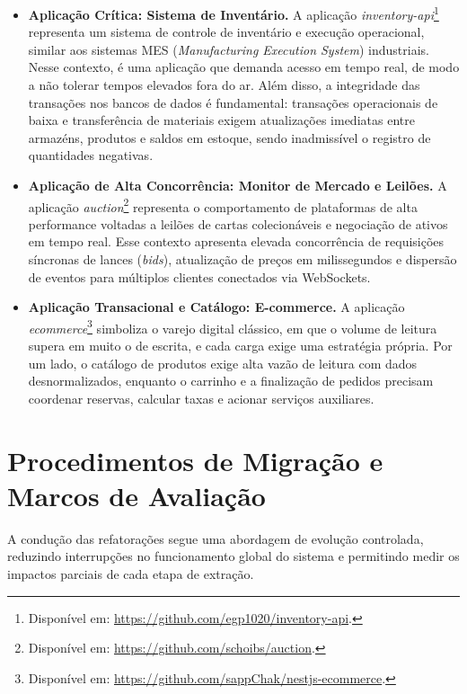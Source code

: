 \begin{itemize}
    \item \textbf{Aplicação Crítica: Sistema de Inventário.} A aplicação \textit{inventory-api}\footnote{Disponível em: \url{https://github.com/egp1020/inventory-api}.} representa um sistema de controle de inventário e execução operacional, similar aos sistemas MES (\textit{Manufacturing Execution System}) industriais. Nesse contexto, é uma aplicação que demanda acesso em tempo real, de modo a não tolerar tempos elevados fora do ar. Além disso, a integridade das transações nos bancos de dados é fundamental: transações operacionais de baixa e transferência de materiais exigem atualizações imediatas entre armazéns, produtos e saldos em estoque, sendo inadmissível o registro de quantidades negativas.
    
    \item \textbf{Aplicação de Alta Concorrência: Monitor de Mercado e Leilões.} A aplicação \textit{auction}\footnote{Disponível em: \url{https://github.com/schoibs/auction}.} representa o comportamento de plataformas de alta performance voltadas a leilões de cartas colecionáveis e negociação de ativos em tempo real. Esse contexto apresenta elevada concorrência de requisições síncronas de lances (\textit{bids}), atualização de preços em milissegundos e dispersão de eventos para múltiplos clientes conectados via WebSockets.
    
    \item \textbf{Aplicação Transacional e Catálogo: E-commerce.} A aplicação \textit{ecommerce}\footnote{Disponível em: \url{https://github.com/sappChak/nestjs-ecommerce}.} simboliza o varejo digital clássico, em que o volume de leitura supera em muito o de escrita, e cada carga exige uma estratégia própria. Por um lado, o catálogo de produtos exige alta vazão de leitura com dados desnormalizados, enquanto o carrinho e a finalização de pedidos precisam coordenar reservas, calcular taxas e acionar serviços auxiliares.
\end{itemize}

\section{Procedimentos de Migração e Marcos de Avaliação}
\label{sec:procedimentos_snapshots}

A condução das refatorações segue uma abordagem de evolução controlada, reduzindo interrupções no funcionamento global do sistema e permitindo medir os impactos parciais de cada etapa de extração.

